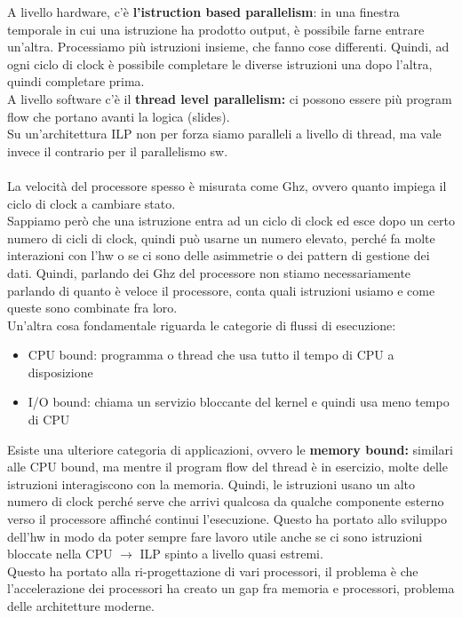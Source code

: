 \documentclass[14pt]{article}
\begin{document}
A livello hardware, c'è \textbf{l'istruction based parallelism}: in una finestra temporale in cui una istruzione ha prodotto output, è possibile farne entrare un'altra. Processiamo più istruzioni insieme, che fanno cose differenti. Quindi, ad ogni ciclo di clock è possibile completare le diverse istruzioni una dopo l'altra, quindi completare prima.\\ A livello software c'è il \textbf{thread level parallelism: }ci possono essere più program flow che portano avanti la logica (slides).\\ Su un'architettura ILP non per forza siamo paralleli a livello di thread, ma vale invece il contrario per il parallelismo sw.\\\\ La velocità del processore spesso è misurata come Ghz, ovvero quanto impiega il ciclo di clock a cambiare stato.\\ Sappiamo però che una istruzione entra ad un ciclo di clock ed esce dopo un certo numero di cicli di clock, quindi può usarne un numero elevato, perché fa molte interazioni con l'hw o se ci sono delle asimmetrie o dei pattern di gestione dei dati. Quindi, parlando dei Ghz del processore non stiamo necessariamente parlando di quanto è veloce il processore, conta quali istruzioni usiamo e come queste sono combinate fra loro.\\ Un'altra cosa fondamentale riguarda le categorie di flussi di esecuzione:
\begin{itemize}
\item CPU bound: programma o thread che usa tutto il tempo di CPU a disposizione
\item I/O bound: chiama un servizio bloccante del kernel e quindi usa meno tempo di CPU
\end{itemize}
Esiste una ulteriore categoria di applicazioni, ovvero le \textbf{memory bound:} similari alle CPU bound, ma mentre il program flow del thread è in esercizio, molte delle istruzioni interagiscono con la memoria. Quindi, le istruzioni usano un alto numero di clock perché serve che arrivi qualcosa da qualche componente esterno verso il processore affinché continui l'esecuzione. Questo ha portato allo sviluppo dell'hw in modo da poter sempre fare lavoro utile anche se ci sono istruzioni bloccate nella CPU $\rightarrow$ ILP spinto a livello quasi estremi.\\ Questo ha portato alla ri-progettazione di vari processori, il problema è che l'accelerazione dei processori ha creato un gap fra memoria e processori, problema delle architetture moderne.
\end{document}
